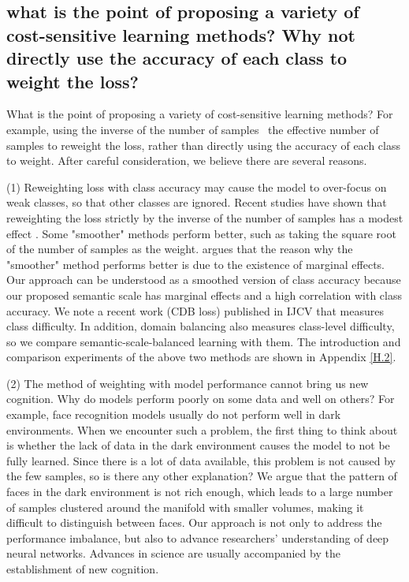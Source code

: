 \documentclass[10pt]{article} %
\begin{document}
\subsection{what is the point of proposing a variety of cost-sensitive learning methods? Why not directly use the accuracy of each class to weight the loss?}

What is the point of proposing a variety of cost-sensitive learning methods? For example, using the inverse of the number of samples \ the effective number of samples to reweight the loss, rather than directly using the accuracy of each class to weight. After careful consideration, we believe there are several reasons.

(1) Reweighting loss with class accuracy may cause the model to over-focus on weak classes, so that other classes are ignored. Recent studies have shown that reweighting the loss strictly by the inverse of the number of samples has a modest effect \cite {paper96,paper103}. Some "smoother" methods perform better, such as taking the square root of the number of samples \cite {paper96} as the weight. \cite {paper14} argues that the reason why the "smoother" method performs better is due to the existence of marginal effects. Our approach can be understood as a smoothed version of class accuracy because our proposed semantic scale has marginal effects and a high correlation with class accuracy. We note a recent work (CDB loss) published in IJCV that measures class difficulty. In addition, domain balancing also measures class-level difficulty, so we compare semantic-scale-balanced learning with them. The introduction and comparison experiments of the above two methods are shown in Appendix \ref{H.2}.

(2) The method of weighting with model performance cannot bring us new cognition. Why do models perform poorly on some data and well on others? For example, face recognition models usually do not perform well in dark environments. When we encounter such a problem, the first thing to think about is whether the lack of data in the dark environment causes the model to not be fully learned. Since there is a lot of data available, this problem is not caused by the few samples, so is there any other explanation? We argue that the pattern of faces in the dark environment is not rich enough, which leads to a large number of samples clustered around the manifold with smaller volumes, making it difficult to distinguish between faces. Our approach is not only to address the performance imbalance, but also to advance researchers' understanding of deep neural networks. Advances in science are usually accompanied by the establishment of new cognition.
\end{document}
